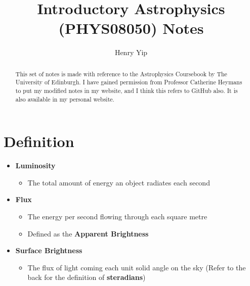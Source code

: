 \documentclass{article}
\title{Introductory Astrophysics (PHYS08050) Notes}
\author{Henry Yip}
\begin{document}
\maketitle
\begin{abstract}
This set of notes is made with reference to the Astrophysics Coursebook by The University of Edinburgh. I have gained permission from Professor Catherine Heymans to put my modified notes in my website, and I think this refers to GitHub also. It is also available in my personal website.
\end{abstract}
\section{Definition}
\begin{itemize}
\item \textbf{Luminosity}
\begin{itemize}
\item The total amount of energy an object radiates each second
\end{itemize}
\item \textbf{Flux}
\begin{itemize}
\item The energy per second flowing through each square metre
\item Defined as the \textbf{Apparent Brightness}
\end{itemize}
\item \textbf{Surface Brightness }
\begin{itemize}
\item The flux of light coming each unit solid angle on the sky (Refer to the back for the definition of \textbf{steradians})
\end{itemize}
\end{itemize}
\end{document}
